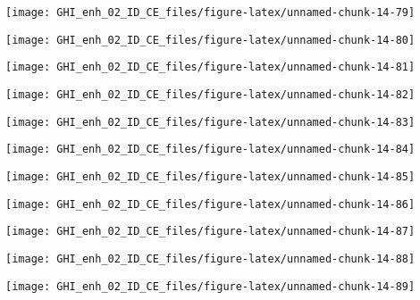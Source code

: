 \documentclass[
  10pt,
  a4paper,oneside]{article}
\begin{document}
\begin{center}\texttt{[image: GHI\_enh\_02\_ID\_CE\_files/figure-latex/unnamed-chunk-14-79]} \end{center}

\begin{center}\texttt{[image: GHI\_enh\_02\_ID\_CE\_files/figure-latex/unnamed-chunk-14-80]} \end{center}

\begin{center}\texttt{[image: GHI\_enh\_02\_ID\_CE\_files/figure-latex/unnamed-chunk-14-81]} \end{center}

\begin{center}\texttt{[image: GHI\_enh\_02\_ID\_CE\_files/figure-latex/unnamed-chunk-14-82]} \end{center}

\begin{center}\texttt{[image: GHI\_enh\_02\_ID\_CE\_files/figure-latex/unnamed-chunk-14-83]} \end{center}

\begin{center}\texttt{[image: GHI\_enh\_02\_ID\_CE\_files/figure-latex/unnamed-chunk-14-84]} \end{center}

\begin{center}\texttt{[image: GHI\_enh\_02\_ID\_CE\_files/figure-latex/unnamed-chunk-14-85]} \end{center}

\begin{center}\texttt{[image: GHI\_enh\_02\_ID\_CE\_files/figure-latex/unnamed-chunk-14-86]} \end{center}

\begin{center}\texttt{[image: GHI\_enh\_02\_ID\_CE\_files/figure-latex/unnamed-chunk-14-87]} \end{center}

\begin{center}\texttt{[image: GHI\_enh\_02\_ID\_CE\_files/figure-latex/unnamed-chunk-14-88]} \end{center}

\begin{center}\texttt{[image: GHI\_enh\_02\_ID\_CE\_files/figure-latex/unnamed-chunk-14-89]} \end{center}
\end{document}
